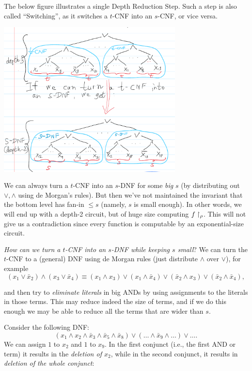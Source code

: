 The below figure illustrates a single Depth Reduction Step. Such a step is also called  ``Switching'', as it switches a $t$-CNF into an $s$-CNF, or vice versa.

\includegraphics[width=0.7\textwidth]{images/image008.png}

\begin{note} We can always turn a $t$-CNF into an $s$-DNF for some \textit{big} $s$ (by distributing out \(\lor, \land\) using de Morgan's rules).
But then we've not maintained the invariant that the bottom level has fan-in \(\leq s\) (namely, \(s\) is small enough).
In other words, we will end up with a depth-2 circuit, but of huge size computing \(f\upharpoonright_\rho\). This will not give us a contradiction since every function is computable by an exponential-size circuit.
\end{note}

\emph{How can we  turn a $t$-CNF into an $s$-DNF while keeping $s$ small}?
We can turn the $t$-CNF to a (general) DNF using de Morgan rules (just distribute $\wedge$ over $\vee$), for example
\[
(x_1 \vee \bar{x}_2) \wedge (x_3 \vee \bar{x}_4) \equiv (x_1 \wedge x_3) \vee (x_1 \wedge \bar{x}_4) \vee (\bar{x}_2 \wedge x_3) \vee (\bar{x}_2 \wedge \bar{x}_4),
\]

and then try to \emph{eliminate literals} in big ANDs by using assignments to the literals in those terms. This may reduce indeed the size of terms, and if we do this enough we may be able to reduce all the terms that are wider than $s$.
 
 
Consider the following DNF:
\[
(x_1 \wedge x_2 \wedge \bar{x}_3 \wedge \bar{x}_5 \wedge \bar{x}_8) \vee ( \dots \wedge \bar{x}_9 \wedge \dots)\lor\dots.
\] We can assign $1$ to $x_2$ and $1$ to $x_9$. In the first conjunct (i.e., the first AND or term) it results in the \emph{deletion of $x_2$}, while in the second conjunct, it results in \emph{deletion of the whole conjunct}:

